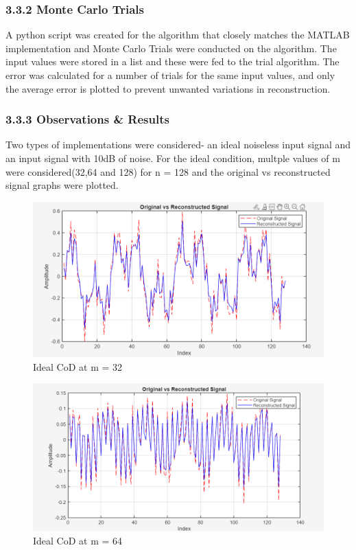 \documentclass[
  letterpaper,
  DIV=11,
  numbers=noendperiod]{scrartcl}
\begin{document}
\subsubsection{3.3.2 Monte Carlo Trials}\label{monte-carlo-trials-1}

A python script was created for the algorithm that closely matches the
MATLAB implementation and Monte Carlo Trials were conducted on the
algorithm. The input values were stored in a list and these were fed to
the trial algorithm. The error was calculated for a number of trials for
the same input values, and only the average error is plotted to prevent
unwanted variations in reconstruction.

\subsubsection{3.3.3 Observations \&
Results}\label{observations-results-2}

Two types of implementations were considered- an ideal noiseless input
signal and an input signal with 10dB of noise. For the ideal condition,
multple values of m were considered(32,64 and 128) for n = 128 and the
original vs reconstructed signal graphs were plotted.

\begin{figure}[H]

{\centering \includegraphics[width=0.8\linewidth,height=\textheight,keepaspectratio]{abar-cs_files/mediabag/cod_m32.png}

}

\caption{Ideal CoD at m = 32}

\end{figure}%

\begin{figure}[H]

{\centering \includegraphics[width=0.8\linewidth,height=\textheight,keepaspectratio]{abar-cs_files/mediabag/cod_m64.png}

}

\caption{Ideal CoD at m = 64}

\end{figure}%
\end{document}
